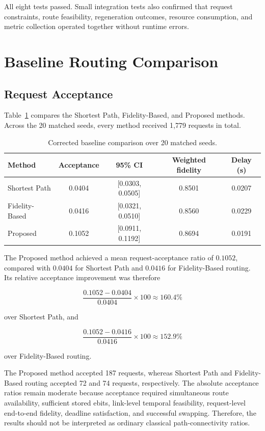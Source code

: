 All eight tests passed. Small integration tests also confirmed that request
constraints, route feasibility, regeneration outcomes, resource consumption,
and metric collection operated together without runtime errors.

\section{Baseline Routing Comparison}

\subsection{Request Acceptance}

Table~\ref{tab:baseline_corrected} compares the Shortest Path,
Fidelity-Based, and Proposed methods. Across the 20 matched seeds, every
method received 1,779 requests in total.

\begin{table}[htbp]
\centering
\caption{Corrected baseline comparison over 20 matched seeds.}
\label{tab:baseline_corrected}
\begin{tabular}{lcccc}
\hline
Method &
Acceptance &
95\% CI &
Weighted fidelity &
Delay (s) \\
\hline
Shortest Path &
0.0404 &
[0.0303, 0.0505] &
0.8501 &
0.0207 \\
Fidelity-Based &
0.0416 &
[0.0321, 0.0510] &
0.8560 &
0.0229 \\
Proposed &
0.1052 &
[0.0911, 0.1192] &
0.8694 &
0.0191 \\
\hline
\end{tabular}
\end{table}

The Proposed method achieved a mean request-acceptance ratio of \(0.1052\),
compared with \(0.0404\) for Shortest Path and \(0.0416\) for
Fidelity-Based routing. Its relative acceptance improvement was therefore

\begin{equation}
\frac{0.1052-0.0404}{0.0404}\times100
\approx160.4\%
\end{equation}

over Shortest Path, and

\begin{equation}
\frac{0.1052-0.0416}{0.0416}\times100
\approx152.9\%
\end{equation}

over Fidelity-Based routing.

The Proposed method accepted 187 requests, whereas Shortest Path and
Fidelity-Based routing accepted 72 and 74 requests, respectively. The absolute
acceptance ratios remain moderate because acceptance required simultaneous
route availability, sufficient stored ebits, link-level temporal feasibility,
request-level end-to-end fidelity, deadline satisfaction, and successful
swapping. Therefore, the results should not be interpreted as ordinary
classical path-connectivity ratios.

